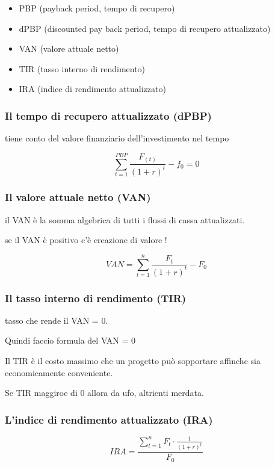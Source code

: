 \begin{itemize}
    \item PBP (payback period, tempo di recupero)
    \item dPBP (discounted pay back period, tempo di recupero
    attualizzato)
    \item VAN (valore attuale netto)
    \item TIR (tasso interno di rendimento)
    \item IRA (indice di rendimento attualizzato)
\end{itemize}

\subsubsection{Il tempo di recupero attualizzato (dPBP)}

tiene conto del valore finanziario dell'investimento nel tempo

\begin{equation*}
    \sum_{t = 1}^{PBP} \frac{F_{(t)}}{(1 + r)^t} - f_0 = 0
\end{equation*}

\subsubsection{Il valore attuale netto (VAN)}
il VAN è la somma algebrica di tutti i flussi di cassa
attualizzati.

se il VAN è positivo c'è creazione di valore !


\begin{equation*}
    VAN = \sum_{t = 1}^{n} \frac{F_t}{(1+r)^t} - F_0
\end{equation*}

\subsubsection{Il tasso interno di rendimento (TIR)}

tasso che rende il VAN = 0.

Quindi faccio formula del VAN = 0

Il TIR è il costo massimo che un progetto può sopportare affinche sia economicamente conveniente.


Se TIR maggiroe di 0 allora da ufo, altrienti merdata.

\subsubsection{L’indice di rendimento attualizzato (IRA)}
\begin{equation*}
    IRA = \frac{
        \sum_{t = 1}^{n} F_t \cdot \frac{1}{(1 + r)^t}
    }{
        F_0
    }
\end{equation*}


